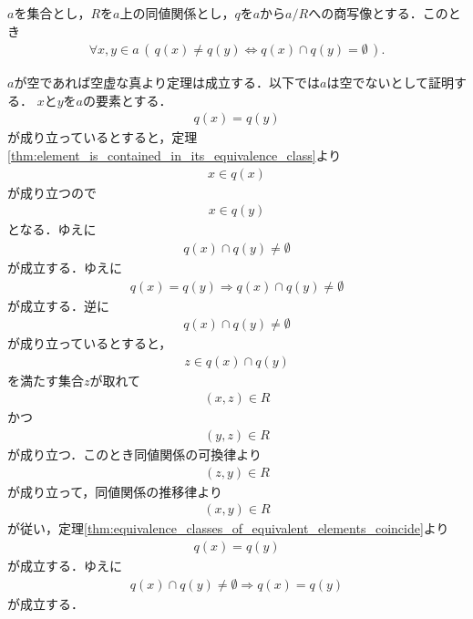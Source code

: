 	\begin{screen}
		\begin{thm}[同値類は一致していなければ交わらない]
		\label{thm:equivalence_classes_of_not_equivalent_elements_are_disjoint}
			$a$を集合とし，$R$を$a$上の同値関係とし，$q$を$a$から$a/R$への商写像とする．このとき
			\begin{align}
				\forall x,y \in a\, \left(\, q(x) \neq q(y) \Longleftrightarrow q(x) \cap q(y) = \emptyset\, \right).
			\end{align}
		\end{thm}
	\end{screen}
	
	\begin{sketch}
		$a$が空であれば空虚な真より定理は成立する．以下では$a$は空でないとして証明する．
		$x$と$y$を$a$の要素とする．
		\begin{align}
			q(x) = q(y)
		\end{align}
		が成り立っているとすると，定理\ref{thm:element_is_contained_in_its_equivalence_class}より
		\begin{align}
			x \in q(x)
		\end{align}
		が成り立つので
		\begin{align}
			x \in q(y)
		\end{align}
		となる．ゆえに
		\begin{align}
			q(x) \cap q(y) \neq \emptyset
		\end{align}
		が成立する．ゆえに
		\begin{align}
			q(x) = q(y) \Longrightarrow q(x) \cap q(y) \neq \emptyset
		\end{align}
		が成立する．逆に
		\begin{align}
			q(x) \cap q(y) \neq \emptyset
		\end{align}
		が成り立っているとすると，
		\begin{align}
			z \in q(x) \cap q(y)
		\end{align}
		を満たす集合$z$が取れて
		\begin{align}
			(x,z) \in R
		\end{align}
		かつ
		\begin{align}
			(y,z) \in R
		\end{align}
		が成り立つ．このとき同値関係の可換律より
		\begin{align}
			(z,y) \in R
		\end{align}
		が成り立って，同値関係の推移律より
		\begin{align}
			(x,y) \in R
		\end{align}
		が従い，定理\ref{thm:equivalence_classes_of_equivalent_elements_coincide}より
		\begin{align}
			q(x) = q(y)
		\end{align}
		が成立する．ゆえに
		\begin{align}
			q(x) \cap q(y) \neq \emptyset \Longrightarrow q(x) = q(y)
		\end{align}
		が成立する．
		\QED
	\end{sketch}